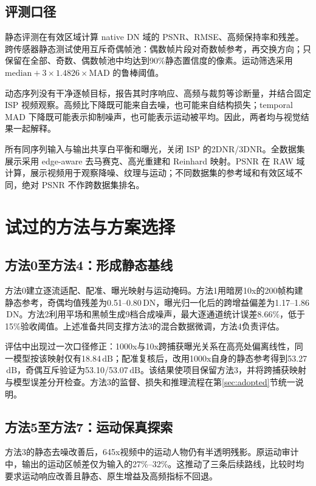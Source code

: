 \documentclass[11pt,a4paper,UTF8,fontset=fandol]{ctexart}
\newcommand{\dn}{\ensuremath{\,\mathrm{DN}}}
\newcommand{\db}{\ensuremath{\,\mathrm{dB}}}
\begin{document}
\subsection{评测口径}

静态评测在有效区域计算 native DN 域的 PSNR、RMSE、高频保持率和残差。跨传感器静态测试使用互斥奇偶帧池：偶数帧片段对奇数帧参考，再交换方向；只保留在全部、奇数、偶数帧池中均达到90\%静态置信度的像素。运动筛选采用 $\mathrm{median}+3\times1.4826\times\mathrm{MAD}$ 的鲁棒阈值。

动态序列没有干净逐帧目标，报告其时序响应、高频与裁剪等诊断量，并结合固定 ISP 视频观察。高频比下降既可能来自去噪，也可能来自结构损失；temporal MAD 下降既可能表示抑制噪声，也可能表示运动被平均。因此，两者均与视觉结果一起解释。

所有同序列输入与输出共享白平衡和曝光，关闭 ISP 的2DNR/3DNR。全数据集展示采用 edge-aware 去马赛克、高光重建和 Reinhard 映射。PSNR 在 RAW 域计算，展示视频用于观察降噪、纹理与运动；不同数据集的参考域和有效区域不同，绝对 PSNR 不作跨数据集排名。

\section{试过的方法与方案选择}
\label{sec:exploration}

\subsection{方法0至方法4：形成静态基线}

方法0建立逐流适配、配准、曝光映射与运动掩码。方法1用暗房10x的200帧构建静态参考，奇偶均值残差为0.51--0.80\dn，曝光归一化后的跨增益偏差为1.17--1.86\dn。方法2利用平场和黑帧生成9档合成噪声，最大逐通道统计误差8.66\%，低于15\%验收阈值。上述准备共同支撑方法3的混合数据微调，方法4负责评估。

评估中出现过一次口径修正：1000x与10x跨捕获曝光关系在高亮处偏离线性，同一模型按该映射仅有18.84\db；配准复核后，改用1000x自身的静态参考得到53.27\db，奇偶互斥验证为53.10/53.07\db。该结果使项目保留方法3，并将跨捕获映射与模型误差分开检查。方法3的监督、损失和推理流程在第\ref{sec:adopted}节统一说明。

\subsection{方法5至方法7：运动保真探索}

方法3的静态去噪改善后，645x视频中的运动人物仍有半透明残影。原运动审计中，输出的运动区帧差仅为输入的27\%--32\%。这推动了三条后续路线，比较时均要求运动响应改善且静态、原生增益及高频指标不回退。
\end{document}

